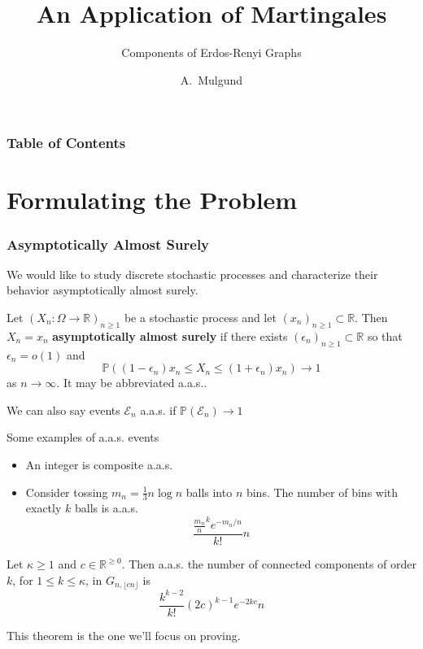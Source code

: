 \documentclass{beamer}
\title[An Application of Martingales] %
{An Application of Martingales}
\subtitle{Components of Erdos-Renyi Graphs}
\author[Mulgund, Abhijeet] %
{A.~Mulgund\inst{1}}
\institute[UIC] %
{
  \inst{1}%
  Mathematics, Statistics, and Computer Science\\
  University of Illinois at Chicago
}
\begin{document}
\frame{\titlepage}


\begin{frame}
\frametitle{Table of Contents}
\tableofcontents
\end{frame}


\section{Formulating the Problem}

\begin{frame}
\frametitle{Asymptotically Almost Surely}
We would like to study discrete stochastic processes and characterize their behavior asymptotically almost surely.

\begin{definition}
    Let \((X_{n}: \Omega \to \mathbb{R})_{n \geq 1}\) be a stochastic process and let \((x_{n})_{n \geq 1}\subset \mathbb{R}\). Then \(X_{n} = x_{n}\) \textbf{asymptotically almost surely} if there exists \((\epsilon_{n})_{n \geq 1} \subset \mathbb{R}\) so that \(\epsilon_{n} = o(1)\) and
    \[\mathbb{P}((1 - \epsilon_{n})x_{n} \leq X_{n} \leq (1 + \epsilon_{n})x_{n}) \to 1\]
    as \(n \to \infty\). It may be abbreviated a.a.s..
\end{definition}

\pause We can also say events \(\mathcal{E}_{n}\) a.a.s. if \(\mathbb{P}(\mathcal{E}_{n}) \to  1\)

\end{frame}



\begin{frame}
    Some examples of a.a.s. events
    \begin{itemize}
        \item<1-> An integer is composite a.a.s.
        \item<2-> Consider tossing \(m_{n} = \frac{1}{3}n\log n\) balls into \(n\) bins. The number of bins with exactly \(k\) balls is a.a.s. \[\frac{\frac{m_{n}}{n}^{k} e^{-m_{n}/n}}{k!}n\] \pause
    \end{itemize}
\pause
    \begin{theorem}
        Let \(\kappa \geq 1\) and \(c \in \mathbb{R}^{\geq 0}\). Then a.a.s. the number of connected components of order \(k\), for \(1 \leq k \leq \kappa\), in \(G_{n, \lfloor cn \rfloor}\) is
    \[\frac{k^{k-2}}{k!}(2c)^{k-1} e^{-2kc}n\]
    \end{theorem}
\pause
This theorem is the one we'll focus on proving.
\end{frame}
\end{document}
